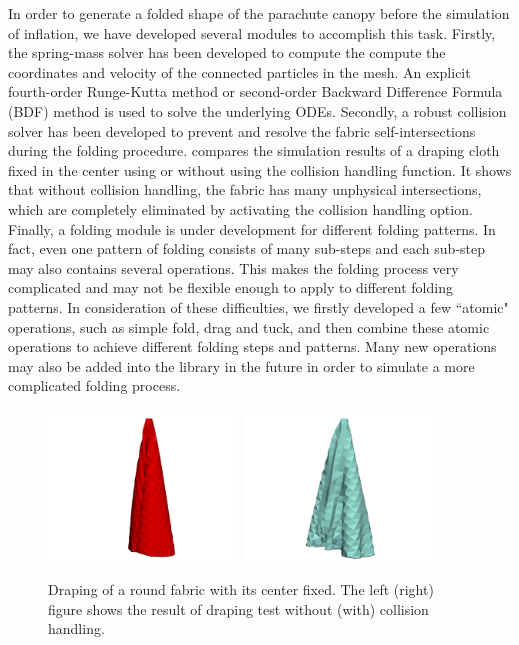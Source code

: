 In order to generate a folded shape of the parachute canopy before the simulation of inflation, we have developed several modules to accomplish this task. Firstly, the spring-mass solver has been developed to compute the compute the coordinates and velocity of the connected particles in the mesh. An explicit fourth-order Runge-Kutta method or second-order Backward Difference Formula (BDF) method is used to solve the underlying ODEs. Secondly, a robust collision solver has been developed to prevent and resolve the fabric self-intersections during the folding procedure.  compares the simulation results of a draping cloth fixed in the center using or without using the collision handling function. It shows that without collision handling, the fabric has many unphysical intersections, which are completely eliminated by activating the collision handling option. Finally, a folding module is under development for different folding patterns. In fact, even one pattern of folding consists of many sub-steps and each sub-step may also contains several operations. This makes the folding process very complicated and may not be flexible enough to apply to different folding patterns. In consideration of these difficulties, we firstly developed a few ``atomic" operations, such as simple fold, drag and tuck, and then combine these atomic operations to achieve different folding steps and patterns. Many new operations may also be added into the library in the future in order to simulate a more complicated folding process.

\begin{figure}[H]
\includegraphics[width=0.45\textwidth]{Figures/drape_front_wocd.jpg}
\includegraphics[width=0.45\textwidth]{Figures/drape_front_wicd.jpg}
\caption{Draping of a round fabric with its center fixed. The left (right) figure shows the result of draping test without (with) collision handling.}
\label{fabric_drape_compare}
\end{figure}

